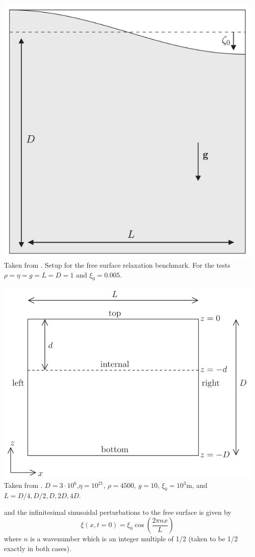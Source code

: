\begin{center}
\begin{minipage}{0.45\textwidth}
\centering
\includegraphics[height=0.8\textwidth]{images/benchmark_relaxation/robh17}\\
{\small Taken from \cite{robh17}. Setup for the free surface relaxation benchmark.
For the tests $\rho=\eta=g=L=D=1$ and $\xi_0=0.005$.}
\end{minipage}\hfill
\begin{minipage}{0.45\textwidth}
\centering
\includegraphics[height=0.8\textwidth]{images/benchmark_relaxation/krwd12}\\
{\small Taken from \cite{krwd12}. $D=3\cdot 10^6$,$\eta=10^{21}$, $\rho=4500$, $g=10$, $\xi_0=10^3$m, and 
$L=D/4,D/2,D,2D,4D$.}
\end{minipage}
\end{center}
and the infinitesimal sinusoidal perturbations to the free surface is given by
\[
\xi(x,t=0)=\xi_0 \cos \left( \frac{2 \pi n x}{L}  \right)
\]
where $n$ is a wavenumber which is an integer multiple of 1/2 (taken to be 1/2 exactly in both cases).



